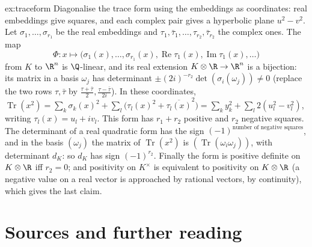 \begin{solution}{ex:traceform}
\idea Diagonalise the trace form using the embeddings as coordinates: real embeddings give squares, and each complex pair
gives a hyperbolic plane $u^2-v^2$.
\writeup Let $\sigma_1,\dots,\sigma_{r_1}$ be the real embeddings and $\tau_1,\bar\tau_1,\dots,\tau_{r_2},\bar\tau_{r_2}$
the complex ones. The map
\[
\Phi:x\mapsto\bigl(\sigma_1(x),\dots,\sigma_{r_1}(x),\operatorname{Re}\tau_1(x),\operatorname{Im}\tau_1(x),\dots\bigr)
\]
from $K$ to $\R^n$ is $\Q$-linear, and its real extension $K\otimes\R\to\R^n$ is a bijection: its
matrix in a basis $\omega_j$ has determinant $\pm(2i)^{-r_2}\det(\sigma_i(\omega_j))\ne0$ (replace the two rows $\tau,\bar
\tau$ by $\frac{\tau+\bar\tau}2,\frac{\tau-\bar\tau}{2i}$). In these coordinates,
$\operatorname{Tr}(x^2)=\sum_k\sigma_k(x)^2+\sum_l\bigl(\tau_l(x)^2+\overline{\tau_l(x)}^2\bigr)=\sum_ky_k^2+
\sum_l2(u_l^2-v_l^2)$, writing $\tau_l(x)=u_l+iv_l$. This form has $r_1+r_2$ positive and $r_2$ negative squares. The
determinant of a real quadratic form has the sign $(-1)^{\text{number of negative squares}}$, and in the basis
$(\omega_j)$ the matrix of $\operatorname{Tr}(x^2)$ is $(\operatorname{Tr}(\omega_i\omega_j))$, with determinant $d_K$:
so $d_K$ has sign $(-1)^{r_2}$. Finally the form is positive definite on $K\otimes\R$ iff $r_2=0$; and positivity on
$K^\times$ is equivalent to positivity on $K\otimes\R$ (a negative value on a real vector is approached by rational
vectors, by continuity), which gives the last claim.
\end{solution}

\section*{Sources and further reading}

